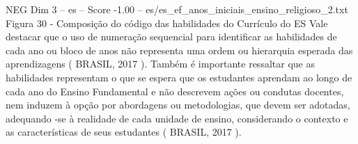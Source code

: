 \begin{textsample}{NEG Dim 3 – es – Score -1.00 – es/es\_ef\_anos\_iniciais\_ensino\_religioso\_2.txt}
Figura 30 - Composição do código das habilidades do Currículo do ES Vale destacar que o uso de numeração sequencial para identificar as habilidades de cada ano ou bloco de anos não representa uma ordem ou hierarquia esperada das aprendizagens ( BRASIL, 2017 ).
Também é importante ressaltar que as habilidades representam o que se espera que os estudantes aprendam ao longo de cada ano do Ensino Fundamental e não descrevem ações ou condutas docentes, nem induzem à opção por abordagens ou metodologias, que devem ser adotadas, adequando -se à realidade de cada unidade de ensino, considerando o contexto e as características de seus estudantes ( BRASIL, 2017 ).

\end{textsample}
